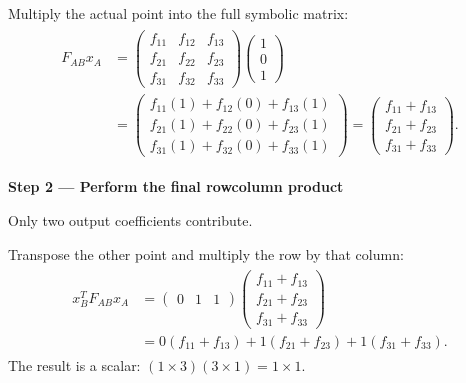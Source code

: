 \documentclass[letterpaper,11pt,english,openany,oneside]{jupyterBook}
\begin{document}
\sphinxAtStartPar
Multiply the actual point into the full symbolic matrix:
{\color{QuizMathBlue} \begin{equation*}
\begin{split}
\begin{aligned}
F_{AB}x_A&=\begin{pmatrix}f_{11}&f_{12}&f_{13}\\f_{21}&f_{22}&f_{23}\\f_{31}&f_{32}&f_{33}\end{pmatrix}\begin{pmatrix}1\\0\\1\end{pmatrix}\\
&=\begin{pmatrix}f_{11}(1)+f_{12}(0)+f_{13}(1)\\f_{21}(1)+f_{22}(0)+f_{23}(1)\\f_{31}(1)+f_{32}(0)+f_{33}(1)\end{pmatrix}
=\begin{pmatrix}f_{11}+f_{13}\\f_{21}+f_{23}\\f_{31}+f_{33}\end{pmatrix}.
\end{aligned}
\end{split}
\end{equation*}}
\par

\par\medskip{}
{\color{QuizStepRed}\bfseries Step 2 — Perform the final row\sphinxhyphen{}column product}\par\smallskip

\sphinxAtStartPar
{} Only two output coefficients contribute.

\sphinxAtStartPar
Transpose the other point and multiply the row by that column:
{\color{QuizMathBlue} \begin{equation*}
\begin{split}
\begin{aligned}
x_B^TF_{AB}x_A
&=\begin{pmatrix}0&1&1\end{pmatrix}\begin{pmatrix}f_{11}+f_{13}\\f_{21}+f_{23}\\f_{31}+f_{33}\end{pmatrix}\\
&=0(f_{11}+f_{13})+1(f_{21}+f_{23})+1(f_{31}+f_{33}).
\end{aligned}
\end{split}
\end{equation*}}
\sphinxAtStartPar
The result is a scalar: {\color{QuizMathBlue} \((1\times3)(3\times1)=1\times1\)}.
\end{document}
